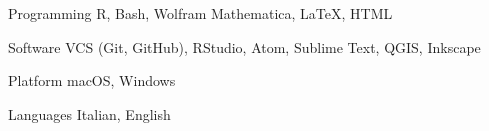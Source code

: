 

\begin{cvskills}

  \cvskill
    {Programming} %
    {R, Bash, Wolfram Mathematica, LaTeX, HTML} %

  \cvskill
    {Software} %
    {VCS (Git, GitHub), RStudio, Atom, Sublime Text, QGIS, Inkscape} %

  \cvskill
    {Platform} %
    {macOS, Windows} %

  \cvskill
    {Languages} %
    {Italian, English} %

\end{cvskills}
